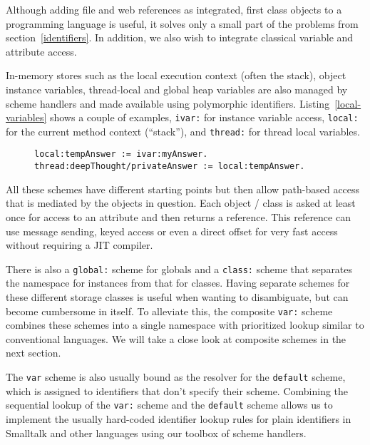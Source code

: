 \documentclass[preprint,authoryear]{acm_proc_article-sp}
\begin{document}
Although adding file and web references as integrated, first class objects to a programming
language is useful, it solves only a small part of the problems from section~\ref{identifiers}.
In addition, we also wish to integrate classical variable and attribute access.

In-memory stores such as the local execution context (often the stack), object instance
variables, thread-local and global heap variables are also managed by scheme handlers
and made available using polymorphic identifiers.  Listing~\ref{local-variables} shows
a couple of examples, {\tt ivar:} for instance variable access, {\tt local:} for the current
method context (``stack''), and {\tt thread:} for thread local variables.

\begin{figure}[htbp]
\begin{lstlisting}[style=numbers,label=local-variables,caption=Different memory variables.]
local:tempAnswer := ivar:myAnswer.
thread:deepThought/privateAnswer := local:tempAnswer.
\end{lstlisting}
\end{figure}

All these schemes have different starting points but then allow path-based access
that is mediated by the objects in question.   Each object / class is asked at least
once for access to an attribute and then returns a reference.   This reference can
use message sending, keyed access or even a direct offset for very fast
access without requiring a JIT compiler.

There is also a {\tt global:} scheme for globals and a {\tt class:} scheme that separates
the namespace for instances from that for classes.  Having separate schemes for
these different storage classes is useful when wanting to disambiguate,
but can become cumbersome in itself.  To alleviate this, the composite
{\tt var:} scheme combines these schemes into a single namespace
with prioritized lookup similar to conventional languages.  We will take
a close look at composite schemes in the next section.  

The {\tt var} scheme is also usually bound as the resolver for the {\tt default}
scheme, which is assigned to identifiers that don't specify their scheme.
Combining the sequential lookup of the {\tt var:} scheme and the {\tt default}
scheme allows us to implement the usually hard-coded identifier lookup
rules for plain identifiers in Smalltalk and other languages using
our toolbox of scheme handlers.
\end{document}
